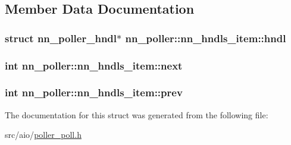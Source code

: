 \subsection{Member Data Documentation}
\subsubsection[{hndl}]{\setlength{\rightskip}{0pt plus 5cm}struct {\bf nn\+\_\+poller\+\_\+hndl}$\ast$ nn\+\_\+poller\+::nn\+\_\+hndls\+\_\+item\+::hndl}\hypertarget{structnn__poller_1_1nn__hndls__item_a0255d9a6f887fe0cd2a0363fb517f84e}{}\label{structnn__poller_1_1nn__hndls__item_a0255d9a6f887fe0cd2a0363fb517f84e}
\subsubsection[{next}]{\setlength{\rightskip}{0pt plus 5cm}int nn\+\_\+poller\+::nn\+\_\+hndls\+\_\+item\+::next}\hypertarget{structnn__poller_1_1nn__hndls__item_a00d334ecc01f3fb24fb117cdb5242215}{}\label{structnn__poller_1_1nn__hndls__item_a00d334ecc01f3fb24fb117cdb5242215}
\subsubsection[{prev}]{\setlength{\rightskip}{0pt plus 5cm}int nn\+\_\+poller\+::nn\+\_\+hndls\+\_\+item\+::prev}\hypertarget{structnn__poller_1_1nn__hndls__item_a7d9970256d55c4c0d7832e2d759682eb}{}\label{structnn__poller_1_1nn__hndls__item_a7d9970256d55c4c0d7832e2d759682eb}


The documentation for this struct was generated from the following file\+:\begin{DoxyCompactItemize}
\item 
src/aio/\hyperlink{poller__poll_8h}{poller\+\_\+poll.\+h}\end{DoxyCompactItemize}

